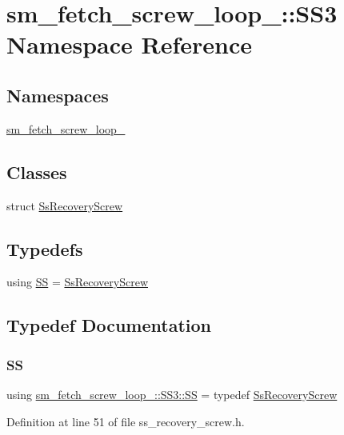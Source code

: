 \hypertarget{namespacesm__fetch__screw__loop__1_1_1SS3}{}\section{sm\+\_\+fetch\+\_\+screw\+\_\+loop\+\_\+:\+:S\+S3 Namespace Reference}
\label{namespacesm__fetch__screw__loop__1_1_1SS3}
\subsection*{Namespaces}
\begin{DoxyCompactItemize}
\item 
 \hyperlink{namespacesm__fetch__screw__loop__1_1_1SS3_1_1sm__fetch__screw__loop__1}{sm\+\_\+fetch\+\_\+screw\+\_\+loop\+\_}
\end{DoxyCompactItemize}
\subsection*{Classes}
\begin{DoxyCompactItemize}
\item 
struct \hyperlink{structsm__fetch__screw__loop__1_1_1SS3_1_1SsRecoveryScrew}{Ss\+Recovery\+Screw}
\end{DoxyCompactItemize}
\subsection*{Typedefs}
\begin{DoxyCompactItemize}
\item 
using \hyperlink{namespacesm__fetch__screw__loop__1_1_1SS3_a4c3bd6948c4e6bfc7ccd19233c9eee6f}{SS} = \hyperlink{structsm__fetch__screw__loop__1_1_1SS3_1_1SsRecoveryScrew}{Ss\+Recovery\+Screw}
\end{DoxyCompactItemize}


\subsection{Typedef Documentation}
\mbox{\label{namespacesm__fetch__screw__loop__1_1_1SS3_a4c3bd6948c4e6bfc7ccd19233c9eee6f}} 
\subsubsection{\texorpdfstring{SS}{SS}}
{\footnotesize\ttfamily using \hyperlink{namespacesm__fetch__screw__loop__1_1_1SS3_a4c3bd6948c4e6bfc7ccd19233c9eee6f}{sm\+\_\+fetch\+\_\+screw\+\_\+loop\+\_\+::\+S\+S3\+::\+SS} = typedef \hyperlink{structsm__fetch__screw__loop__1_1_1SS3_1_1SsRecoveryScrew}{Ss\+Recovery\+Screw}}



Definition at line 51 of file ss\+\_\+recovery\+\_\+screw.\+h.


